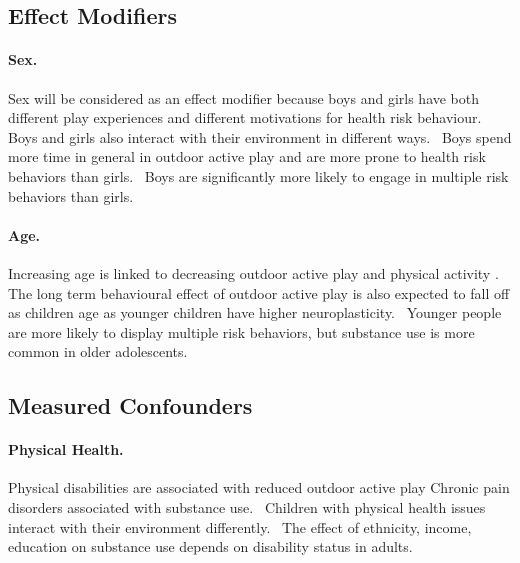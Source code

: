 \documentclass [11pt]{article}
\begin{document}
\subsection{Effect Modifiers} 

\paragraph{Sex.} Sex will be considered as an effect modifier because boys and girls have both different play experiences and different motivations for health risk behaviour.~\cite{Schuster2013-rz}  Boys and girls also interact with their environment in different ways.~\cite{Bocarro2015-mk, Kaczynski2013-hz, Haug2010-he, Pawlowski2016-vx} Boys spend more time in general in outdoor active play \cite{Bringolf-Isler2010-ma,Lee2016-rb} and are more prone to health risk behaviors than girls.~\cite{Simmons2016-vg,Wellman2016-yp} Boys are significantly more likely to engage in multiple risk behaviors than girls.~\cite{Filippidis2016-qo}

\paragraph{Age.} Increasing age is linked to decreasing outdoor active play and physical activity \cite{Bringolf-Isler2010-ma,Uijtdewilligen2011-km}. The long term behavioural effect of outdoor active play is also expected to fall off as children age as younger children have higher neuroplasticity.~\cite{Chambers2003-db} Younger people are more likely to display multiple risk behaviors,\cite{Filippidis2016-qo} but substance use is more common in older adolescents.~\cite{Wellman2016-yp}

\subsection{Measured Confounders}

\paragraph{Physical Health.} Physical disabilities are associated with reduced outdoor active play \cite{Kolehmainen2015-xn} Chronic pain disorders associated with substance use.~\cite{McLaren2017-gl} Children with physical health issues interact with their environment differently.~\cite{An2017-my,Moore2015-gr,Crawford2014-sy}  The effect of ethnicity, income, education on substance use depends on disability status in adults.~\cite{Courtney-Long2017-bz}
\end{document}
